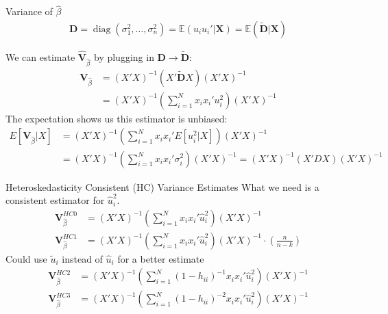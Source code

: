 \documentclass[aspectratio=169]{beamer}
\begin{document}
\begin{frame}{Variance of $\widehat{\beta}$}
\begin{align*}
\mathbf { D } = \operatorname { diag } \left( \sigma _ { 1 } ^ { 2 } , \ldots , \sigma _ { n } ^ { 2 } \right)
= \mathbb { E } \left( u_i u_i'  | \mathbf { X } \right)
= \mathbb { E } \left( \widetilde{\mathbf{D}}| \mathbf { X } \right)
\end{align*}

We can estimate $\widehat{\mathbf{V}}_{\widehat{\beta}}$ by plugging in $\mathbf{D} \rightarrow  \widetilde{\mathbf{D}} $:
\begin{align*}
\mathbf{V}_{\widehat{\beta}} &= (X'X)^{-1} (X'  \widetilde{\mathbf{D}} X) (X'X)^{-1} \\
&= (X'X)^{-1} \left(\sum_{i=1}^N x_i x_i' u_i^2  \right) (X'X)^{-1} 
\end{align*}
The expectation shows us this estimator is unbiased:
\begin{align*}
E[\mathbf{V}_{\widehat{\beta}} | X]
&= (X'X)^{-1} \left(\sum_{i=1}^N x_i x_i' E[u_i^2 | X] \right) (X'X)^{-1} \\
&= (X'X)^{-1} \left(\sum_{i=1}^N x_i x_i' \sigma_i^2 \right) (X'X)^{-1} = (X'X)^{-1} (X' D X) (X'X)^{-1} 
\end{align*}
\end{frame}



\begin{frame}{Heteroskedasticity Consistent (HC) Variance Estimates}
What we need is a consistent estimator for $\hat{u}^2_i$.
\begin{align*}
\mathbf{V}_{\widehat{\beta}}^{HC0}&= (X'X)^{-1} \left(\sum_{i=1}^N x_i x_i' \hat{u}_i^2 \right) (X'X)^{-1} \\
\mathbf{V}_{\widehat{\beta}}^{HC1}&= (X'X)^{-1} \left(\sum_{i=1}^N x_i x_i' \hat{u}_i^2 \right) (X'X)^{-1} \cdot \left(\frac{n}{n-k}  \right)
\end{align*}
Could use $\tilde{u}_i$ instead of $\hat{u}_i$ for a better estimate
\begin{align*}
\mathbf{V}_{\widehat{\beta}}^{HC2}&= (X'X)^{-1} \left(\sum_{i=1}^N (1-h_{ii})^{-1} x_i x_i' \hat{u}_i^2 \right) (X'X)^{-1} \\
\mathbf{V}_{\widehat{\beta}}^{HC3}&= (X'X)^{-1} \left(\sum_{i=1}^N (1-h_{ii})^{-2} x_i x_i' \hat{u}_i^2 \right) (X'X)^{-1} \\
\end{align*}
\end{frame}
\end{document}
